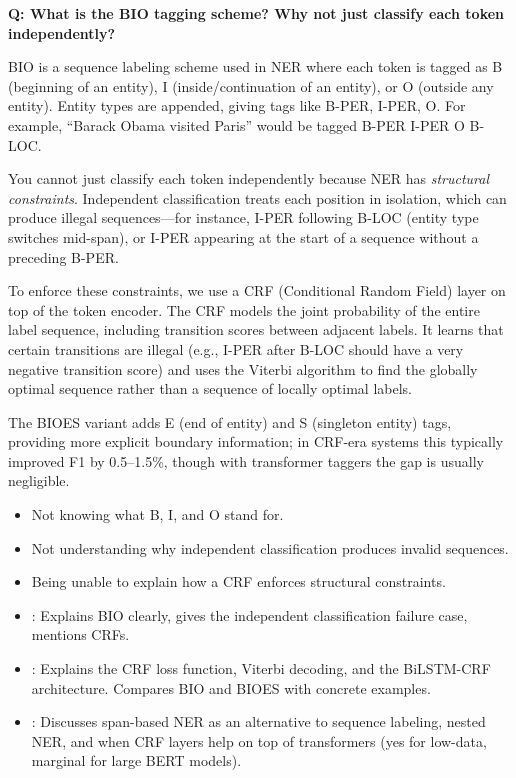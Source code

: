 \begin{interviewq}
\textbf{Q: What is the BIO tagging scheme? Why not just classify each token independently?}

 \quad {} \quad \badgefreq{\freqmed}

\stronganswer
BIO is a sequence labeling scheme used in NER where each token is tagged as B (beginning of
an entity), I (inside/continuation of an entity), or O (outside any entity). Entity types
are appended, giving tags like B-PER, I-PER, O. For example, ``Barack Obama visited Paris''
would be tagged B-PER I-PER O B-LOC.

You cannot just classify each token independently because NER has \emph{structural
constraints}. Independent classification treats each position in isolation, which can
produce illegal sequences---for instance, I-PER following B-LOC (entity type switches
mid-span), or I-PER appearing at the start of a sequence without a preceding B-PER.

To enforce these constraints, we use a CRF (Conditional Random Field) layer on top of the
token encoder. The CRF models the joint probability of the entire label sequence, including
transition scores between adjacent labels. It learns that certain transitions are illegal
(e.g., I-PER after B-LOC should have a very negative transition score) and uses the Viterbi
algorithm to find the globally optimal sequence rather than a sequence of locally optimal
labels.

The BIOES variant adds E (end of entity) and S (singleton entity) tags, providing more
explicit boundary information; in CRF-era systems this typically improved F1 by
0.5--1.5\%, though with transformer taggers the gap is usually negligible.

\redflags
\begin{itemize}
    \item Not knowing what B, I, and O stand for.
    \item Not understanding why independent classification produces invalid sequences.
    \item Being unable to explain how a CRF enforces structural constraints.
\end{itemize}


\goodgreat
\begin{itemize}
    \item {}: Explains BIO clearly, gives the independent classification
    failure case, mentions CRFs.
    \item {}: Explains the CRF loss function, Viterbi decoding, and the
    BiLSTM-CRF architecture. Compares BIO and BIOES with concrete examples.
    \item {}: Discusses span-based NER as an alternative to sequence labeling,
    nested NER, and when CRF layers help on top of transformers (yes for low-data, marginal
    for large BERT models).
\end{itemize}


\end{interviewq}
